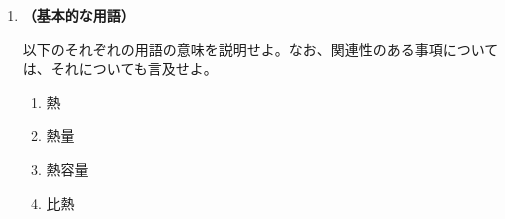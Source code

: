 \documentclass[uplatex,dvipdfmx,a4paper,11pt]{jsarticle}
\begin{document}
\begin{enumerate}
\item
{\bf （基本的な用語）}

以下のそれぞれの用語の意味を説明せよ。なお、関連性のある事項については、それについても言及せよ。

\begin{enumerate}
\item
熱


\item
熱量
%
%

\item
熱容量
%
%
%

\item
比熱

%
%
%
%
%
%


\end{enumerate}
\end{enumerate}
\end{document}
